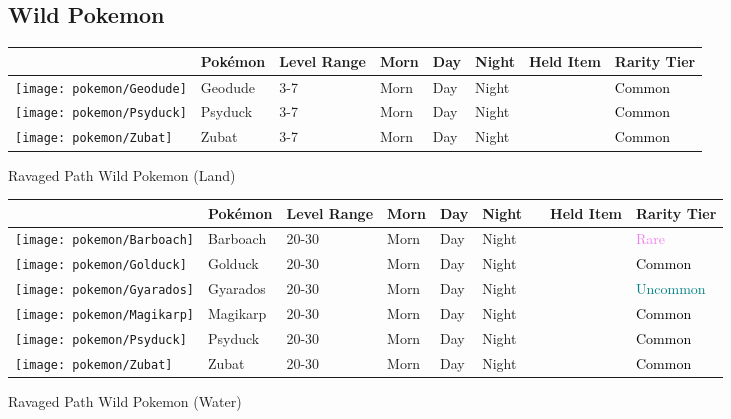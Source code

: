 \subsection{Wild Pokemon}%
\label{subsec:WildPokemon}%
\begin{longtable}{||l l l l l l l l||}%
\hline%
&Pokémon&Level Range&Morn&Day&Night&Held Item&Rarity Tier\\%
\hline%
\endhead%
\hline%
\texttt{[image: pokemon/Geodude]}&Geodude&3{-}7&Morn&Day&Night&&\textcolor{black}{%
Common%
}\\%
\hline%
\texttt{[image: pokemon/Psyduck]}&Psyduck&3{-}7&Morn&Day&Night&&\textcolor{black}{%
Common%
}\\%
\hline%
\texttt{[image: pokemon/Zubat]}&Zubat&3{-}7&Morn&Day&Night&&\textcolor{black}{%
Common%
}\\%
\hline%
\end{longtable}%
\caption{Ravaged Path Wild Pokemon (Land)}%
\begin{longtable}{||l l l l l l l l l||}%
\hline%
&Pokémon&Level Range&Morn&Day&Night&&Held Item&Rarity Tier\\%
\hline%
\endhead%
\hline%
\texttt{[image: pokemon/Barboach]}&Barboach&20{-}30&Morn&Day&Night&&&\textcolor{violet}{%
Rare%
}\\%
\hline%
\texttt{[image: pokemon/Golduck]}&Golduck&20{-}30&Morn&Day&Night&&&\textcolor{black}{%
Common%
}\\%
\hline%
\texttt{[image: pokemon/Gyarados]}&Gyarados&20{-}30&Morn&Day&Night&&&\textcolor{teal}{%
Uncommon%
}\\%
\hline%
\texttt{[image: pokemon/Magikarp]}&Magikarp&20{-}30&Morn&Day&Night&&&\textcolor{black}{%
Common%
}\\%
\hline%
\texttt{[image: pokemon/Psyduck]}&Psyduck&20{-}30&Morn&Day&Night&&&\textcolor{black}{%
Common%
}\\%
\hline%
\texttt{[image: pokemon/Zubat]}&Zubat&20{-}30&Morn&Day&Night&&&\textcolor{black}{%
Common%
}\\%
\hline%
\end{longtable}%
\caption{Ravaged Path Wild Pokemon (Water)}